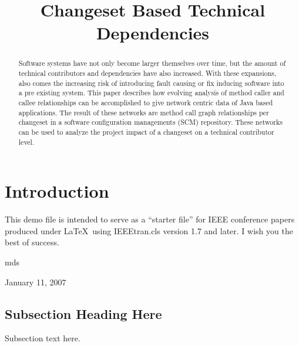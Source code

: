 \documentclass[conference]{IEEEtran}
\begin{document}
\title{Changeset Based Technical Dependencies}

\author{
\and
{}
\and
{}
}

\maketitle


\begin{abstract}
Software systems have not only become larger themselves over time, but the amount of
technical contributors and dependencies have also increased. With these expansions, also comes
the increasing risk of introducing fault causing or fix inducing software into a pre existing system.
This paper describes how evolving analysis of method caller and callee relationships can be
accomplished to give network centric data of Java based applications. The result of these networks
are method call graph relationships per changeset in a software configuration managements (SCM) 
repository. These networks can be used to analyze the project impact of a changeset on a
technical contributor level.
\end{abstract}


\section{Introduction}
This demo file is intended to serve as a ``starter file''
for IEEE conference papers produced under \LaTeX\ using
IEEEtran.cls version 1.7 and later.
I wish you the best of success.

\hfill mds
 
\hfill January 11, 2007

\subsection{Subsection Heading Here}
Subsection text here.
\end{document}
